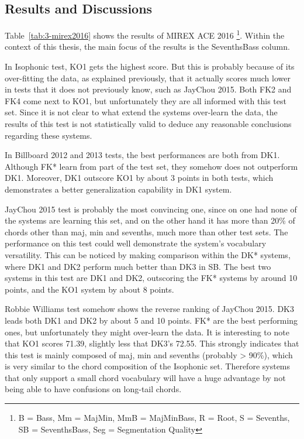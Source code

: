 \subsection{Results and Discussions}
Table~\ref{tab:3-mirex2016} shows the results of MIREX ACE 2016 \footnote{B = Bass, Mm = MajMin, MmB = MajMinBass, R = Root, S = Sevenths, SB = SeventhsBass, Seg = Segmentation Quality}. Within the context of this thesis, the main focus of the results is the SeventhsBass column.

In Isophonic test, KO1 gets the highest score. But this is probably because of its over-fitting the data, as explained previously, that it actually scores much lower in tests that it does not previously know, such as JayChou 2015. Both FK2 and FK4 come next to KO1, but unfortunately they are all informed with this test set. Since it is not clear to what extend the systems over-learn the data, the results of this test is not statistically valid to deduce any reasonable conclusions regarding these systems.

In Billboard 2012 and 2013 tests, the best performances are both from DK1. Although FK* learn from part of the test set, they somehow does not outperform DK1. Moreover, DK1 outscore KO1 by about 3 points in both tests, which demonstrates a better generalization capability in DK1 system.

JayChou 2015 test is probably the most convincing one, since on one had none of the systems are learning this set, and on the other hand it has more than 20\% of chords other than maj, min and sevenths, much more than other test sets. The performance on this test could well demonstrate the system's vocabulary versatility. This can be noticed by making comparison within the DK* systems, where DK1 and DK2 perform much better than DK3 in SB. The best two systems in this test are DK1 and DK2, outscoring the FK* systems by around 10 points, and the KO1 system by about 8 points.

Robbie Williams test somehow shows the reverse ranking of JayChou 2015. DK3 leads both DK1 and DK2 by about 5 and 10 points. FK* are the best performing ones, but unfortunately they might over-learn the data. It is interesting to note that KO1 scores 71.39, slightly less that DK3's 72.55. This strongly indicates that this test is mainly composed of maj, min and sevenths (probably > 90\%), which is very similar to the chord composition of the Isophonic set. Therefore systems that only support a small chord vocabulary will have a huge advantage by not being able to have confusions on long-tail chords.


